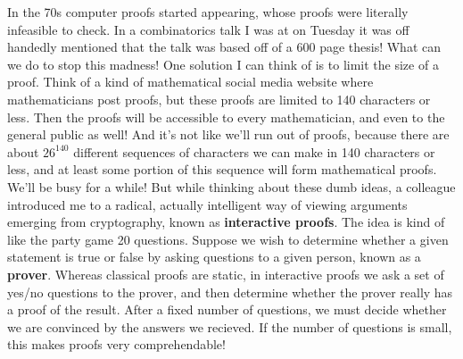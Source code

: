 \documentclass{article}
\theoremstyle{plain}
\theoremstyle{definition}
\begin{document}
%
In the 70s computer proofs started appearing, whose proofs were literally infeasible to check. In a combinatorics talk I was at on Tuesday it was off handedly mentioned that the talk was based off of a 600 page thesis! What can we do to stop this madness! One solution I can think of is to limit the size of a proof. Think of a kind of mathematical social media website where mathematicians post proofs, but these proofs are limited to 140 characters or less. Then the proofs will be accessible to every mathematician, and even to the general public as well! And it's not like we'll run out of proofs, because there are about $26^{140}$ different sequences of characters we can make in 140 characters or less, and at least some portion of this sequence will form mathematical proofs. We'll be busy for a while! But while thinking about these dumb ideas, a colleague introduced me to a radical, actually intelligent way of viewing arguments emerging from cryptography, known as {\bf interactive proofs}. The idea is kind of like the party game 20 questions. Suppose we wish to determine whether a given statement is true or false by asking questions to a given person, known as a {\bf prover}. Whereas classical proofs are static, in interactive proofs we ask a set of yes/no questions to the prover, and then determine whether the prover really has a proof of the result. After a fixed number of questions, we must decide whether we are convinced by the answers we recieved. If the number of questions is small, this makes proofs very comprehendable!
\end{document}
